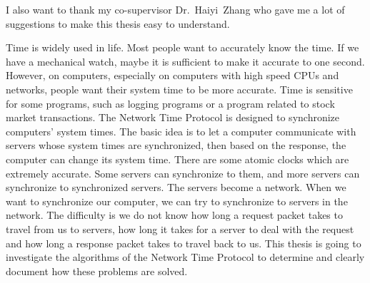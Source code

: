 I also want to thank my co-supervisor Dr.~Haiyi~Zhang who gave me a lot of
suggestions to make this thesis easy to understand.



\tocAndSuch



Time is widely used in life. Most people want to accurately know the time. If
we have a mechanical watch, maybe it is sufficient to make it accurate to one
second. However, on computers, especially on computers with high speed CPUs and
networks, people want their system time to be more accurate.  Time is sensitive
for some programs, such as logging programs or a program related to stock
market transactions. The Network Time Protocol is designed to synchronize
computers' system times. The basic idea is to let a computer communicate with
servers whose system times are synchronized, then based on the response, the
computer can change its system time. There are some atomic clocks which are
extremely accurate. Some servers can synchronize to them, and more servers can
synchronize to synchronized servers. The servers become a network.  When we
want to synchronize our computer, we can try to synchronize to servers in the
network.  The difficulty is we do not know how long a request packet takes to
travel from us to servers, how long it takes for a server to deal with the
request and how long a response packet takes to travel back to us.  This thesis
is going to investigate the algorithms of the Network Time Protocol to
determine and clearly document how  these problems are solved.


\afterpreface
